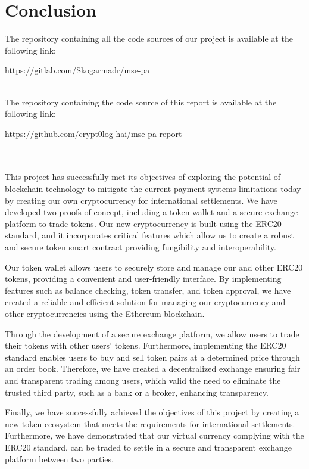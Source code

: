 \chapter{Conclusion}
\label{ch:conclusion}

The repository containing all the code sources of our project is available at the following link:


\centerline{\url{https://gitlab.com/Skogarmadr/mse-pa}}
~\\
The repository containing the code source of this report is available at the following link:


\centerline{\url{https://github.com/crypt0log-hai/mse-pa-report}}


~\\\\


This project has successfully met its objectives of exploring the potential of blockchain technology to mitigate the current
payment systems limitations today by creating our own cryptocurrency for international settlements. We have developed two proofs of concept, including a token wallet and a secure exchange platform to trade tokens. Our new cryptocurrency is built using the ERC20 standard, and it incorporates critical features which allow us to create a robust and secure token smart contract providing fungibility and interoperability.


Our token wallet allows users to securely store and manage our and other ERC20 tokens, providing
a convenient and user-friendly interface. By implementing features such as balance checking, token transfer,
and token approval, we have created a reliable and efficient solution for managing our cryptocurrency and other cryptocurrencies
using the Ethereum blockchain.


Through the development of a secure exchange platform, we allow users to trade their tokens with other users' tokens. Furthermore, implementing the ERC20 standard enables users to buy and sell token pairs at a determined price through
an order book. Therefore, we have created a decentralized exchange ensuring fair and transparent trading among users,
which valid the need to eliminate the trusted third party, such as a bank or a broker, enhancing transparency.


Finally, we have successfully achieved the objectives of this project by creating a new token ecosystem that meets the requirements
for international settlements. Furthermore, we have demonstrated that our virtual currency complying with the ERC20 standard, can be traded to settle in a secure and transparent exchange platform between two parties.


